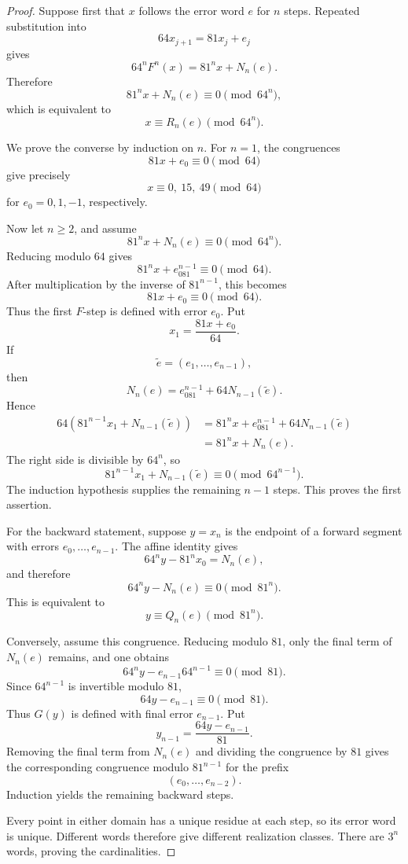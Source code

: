 \documentclass[11pt]{article}
\theoremstyle{remark}
\begin{document}
\begin{proof}
Suppose first that \(x\) follows the error word \(e\) for \(n\) steps.  Repeated substitution into
\[
64x_{j+1}=81x_j+e_j
\]
gives
\[
64^nF^n(x)=81^nx+N_n(e).
\]
Therefore
\[
81^nx+N_n(e)\equiv0\pmod{64^n},
\]
which is equivalent to
\[
x\equiv R_n(e)\pmod{64^n}.
\]

We prove the converse by induction on \(n\).  For \(n=1\), the congruences
\[
81x+e_0\equiv0\pmod{64}
\]
give precisely
\[
x\equiv0,\ 15,\ 49\pmod{64}
\]
for \(e_0=0,1,-1\), respectively.

Now let \(n\ge2\), and assume
\[
81^nx+N_n(e)\equiv0\pmod{64^n}.
\]
Reducing modulo \(64\) gives
\[
81^nx+e_081^{n-1}\equiv0\pmod{64}.
\]
After multiplication by the inverse of \(81^{n-1}\), this becomes
\[
81x+e_0\equiv0\pmod{64}.
\]
Thus the first \(F\)-step is defined with error \(e_0\).  Put
\[
x_1=\frac{81x+e_0}{64}.
\]
If
\[
\widetilde e=(e_1,\ldots,e_{n-1}),
\]
then
\[
N_n(e)=e_081^{n-1}+64N_{n-1}(\widetilde e).
\]
Hence
\begin{align*}
64\left(81^{n-1}x_1+N_{n-1}(\widetilde e)\right)
&=
81^nx+e_081^{n-1}+64N_{n-1}(\widetilde e)\\
&=
81^nx+N_n(e).
\end{align*}
The right side is divisible by \(64^n\), so
\[
81^{n-1}x_1+N_{n-1}(\widetilde e)
\equiv0\pmod{64^{n-1}}.
\]
The induction hypothesis supplies the remaining \(n-1\) steps.  This proves the first assertion.

For the backward statement, suppose \(y=x_n\) is the endpoint of a forward segment with errors \(e_0,\ldots,e_{n-1}\).  The affine identity gives
\[
64^ny-81^nx_0=N_n(e),
\]
and therefore
\[
64^ny-N_n(e)\equiv0\pmod{81^n}.
\]
This is equivalent to
\[
y\equiv Q_n(e)\pmod{81^n}.
\]

Conversely, assume this congruence.  Reducing modulo \(81\), only the final term of \(N_n(e)\) remains, and one obtains
\[
64^ny-e_{n-1}64^{n-1}\equiv0\pmod{81}.
\]
Since \(64^{n-1}\) is invertible modulo \(81\),
\[
64y-e_{n-1}\equiv0\pmod{81}.
\]
Thus \(G(y)\) is defined with final error \(e_{n-1}\).  Put
\[
y_{n-1}=\frac{64y-e_{n-1}}{81}.
\]
Removing the final term from \(N_n(e)\) and dividing the congruence by \(81\) gives the corresponding congruence modulo \(81^{n-1}\) for the prefix
\[
(e_0,\ldots,e_{n-2}).
\]
Induction yields the remaining backward steps.

Every point in either domain has a unique residue at each step, so its error word is unique.  Different words therefore give different realization classes.  There are \(3^n\) words, proving the cardinalities.
\end{proof}
\end{document}
